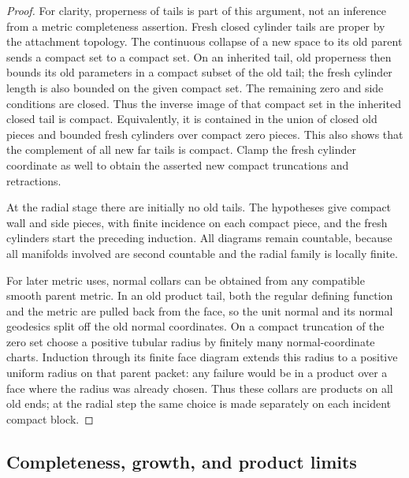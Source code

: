 \begin{proof}
For clarity, properness of tails is part of this argument, not an
inference from a metric completeness assertion.  Fresh closed cylinder
tails are proper by the attachment topology.  The continuous collapse
of a new space to its old parent sends a compact set to a compact set.
On an inherited tail, old properness then bounds its old parameters
in a compact subset of the old tail; the fresh cylinder length is
also bounded on the given compact set.  The remaining zero and side
conditions are closed.  Thus the inverse image of that compact set
in the inherited closed tail is compact.  Equivalently, it is contained
in the union of closed old pieces and bounded fresh cylinders over
compact zero pieces.  This also shows that the complement of all new
far tails is compact.  Clamp the fresh cylinder coordinate as well
to obtain the asserted new compact truncations and retractions.

At the radial stage there are initially no old tails.  The hypotheses
give compact wall and side pieces, with finite incidence on each
compact piece, and the fresh cylinders start the preceding induction.
All diagrams remain countable, because all manifolds involved are
second countable and the radial family is locally finite.

For later metric uses, normal collars can be obtained from any
compatible smooth parent metric.  In an old product tail, both the
regular defining function and the metric are pulled back from the
face, so the unit normal and its normal geodesics split off the old
normal coordinates.  On a compact truncation of the zero set choose
a positive tubular radius by finitely many normal-coordinate charts.
Induction through its finite face diagram extends this radius to a
positive uniform radius on that parent packet: any failure would
be in a product over a face where the radius was already chosen.
Thus these collars are products on all old ends; at the radial step
the same choice is made separately on each incident compact block.
\end{proof}

\subsection{Completeness, growth, and product limits}

